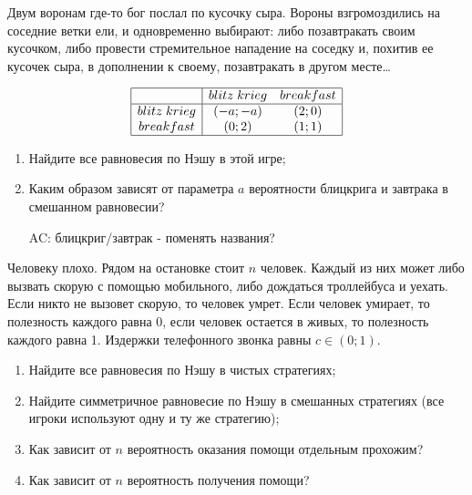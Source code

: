 \begin{problem}
Двум воронам где-то бог послал по кусочку сыра. Вороны взгромоздились на соседние ветки ели, и одновременно выбирают: либо позавтракать своим кусочком, либо провести стремительное нападение на соседку и, похитив ее кусочек сыра, в дополнении к своему, позавтракать в другом месте\ldots \par
\[\begin{array}{|c|cc|}
\hline
{} & {blitz\; krieg} & {breakfast} \\
\hline
{blitz\; krieg} & {\left(-a;-a\right)} & {\left(2;0\right)} \\
{breakfast} & {\left(0;2\right)} & {\left(1;1\right)} \\
\hline
\end{array}\]
\begin{enumerate}
\item Найдите все равновесия по Нэшу в этой игре;\par
\item Каким образом зависят от параметра  $a$  вероятности блицкрига и завтрака в смешанном равновесии?\par
{\red  AC: блицкриг/завтрак - поменять названия?}
\end{enumerate}



\begin{sol}

\end{sol}
\end{problem}



\begin{problem}

Человеку плохо. Рядом на остановке стоит $n$  человек. Каждый из них может либо вызвать скорую с помощью мобильного, либо дождаться троллейбуса и уехать. Если никто не вызовет скорую, то человек умрет. Если человек умирает, то полезность каждого равна 0, если человек остается в живых, то полезность каждого равна 1. Издержки телефонного звонка равны  $c\in \left(0;1\right)$.\par
\begin{enumerate}
\item Найдите все равновесия по Нэшу в чистых стратегиях;\par
\item Найдите симметричное равновесие по Нэшу в смешанных стратегиях (все игроки используют одну и ту же стратегию);\par
\item  Как зависит от  $n$  вероятность оказания помощи отдельным прохожим?\par
\item Как зависит от  $n$  вероятность получения помощи?\par
\end{enumerate}



\begin{sol}

\end{sol}
\end{problem}



